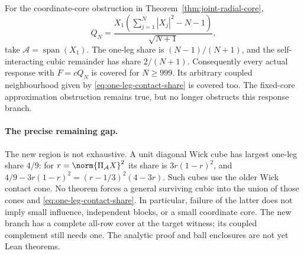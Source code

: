 For the coordinate-core obstruction in
Theorem~\ref{thm:joint-radial-core},
\[
 Q_N=\frac{X_1(\sum_{j=1}^N|X_j|^2-N-1)}{\sqrt{N+1}},
\]
take $\mathcal A=\operatorname{span}(X_1)$. The one-leg share is
$(N-1)/(N+1)$, and the self-interacting cubic remainder has share
$2/(N+1)$. Consequently every actual response with $F=cQ_N$ is
covered for $N\ge999$. Its arbitrary coupled neighbourhood given by
\eqref{eq:one-leg-contact-share} is covered too. The fixed-core
approximation obstruction remains true, but no longer obstructs this
response branch.

\paragraph{The precise remaining gap.}
The new region is not exhaustive. A unit diagonal Wick cube has largest
one-leg share $4/9$: for $r=\norm{\Pi_{\mathcal A}X}^2$ its share is
$3r(1-r)^2$, and
$4/9-3r(1-r)^2=(r-1/3)^2(4-3r)$. Such cubes use the older Wick
contact cone. No theorem forces a general surviving cubic into the
union of those cones and \eqref{eq:one-leg-contact-share}.
In particular, failure of the latter does not imply small influence,
independent blocks, or a small coordinate core. The new branch has a
complete all-row cover at the target witness; its coupled complement
still needs one. The analytic proof and ball enclosures are not yet
Lean theorems.
